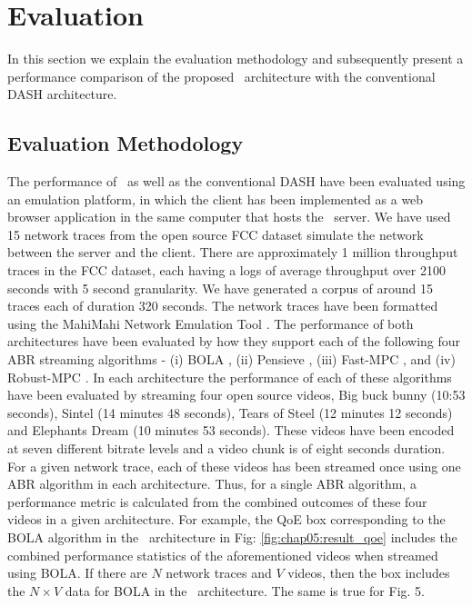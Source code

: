 \section{Evaluation}\label{sec:chap05:evaluation}
In this section we explain the evaluation methodology and subsequently present a performance comparison of the proposed \bel\ architecture with the conventional {DASH architecture}. 
\subsection{Evaluation Methodology}
The performance of \bel\ as well as the conventional \ac{DASH} have been evaluated using an emulation platform, in which the client has been implemented as a web browser application in the same computer that hosts the \servname\ server. We have used 15 network traces from the open source FCC dataset \cite{FCC2016} simulate the network between the server and the client. There are approximately 1 million throughput traces in the FCC dataset, each having a logs of average throughput over 2100 seconds with 5 second granularity. We have generated a corpus of around 15 traces each of duration 320 seconds.  The network traces have been formatted using the MahiMahi Network Emulation Tool \cite{Netravali2015}. The performance of both architectures have been evaluated by how they support each of the following four \ac{ABR} streaming algorithms - (i) BOLA \cite{Spiteri2016}, (ii) Pensieve \cite{Mao2017}, (iii) Fast-MPC \cite{Yin2015}, and (iv) Robust-MPC \cite{Yin2015}. In each architecture the performance of each of these algorithms have been evaluated by streaming four open source videos, Big buck bunny (10:53 seconds), Sintel (14 minutes 48 seconds),  Tears of Steel (12 minutes 12 seconds) and Elephants Dream (10 minutes 53 seconds). These videos have been encoded at seven different bitrate levels and a video chunk is of eight seconds duration. For a given network trace, each of these videos has been streamed once using one \ac{ABR} algorithm in each architecture. Thus, for a single ABR algorithm, a performance metric is calculated from the combined outcomes of these four videos  in a given architecture. For example, the \ac{QoE} box corresponding to the BOLA algorithm in the \bel\ architecture in Fig: \ref{fig:chap05:result_qoe} includes the combined performance statistics of the aforementioned videos when streamed using BOLA. If there are $N$ network traces and $V$ videos, then the box includes the $N\times V$ data for BOLA in the \bel\ architecture. The same is true for Fig. 5.
